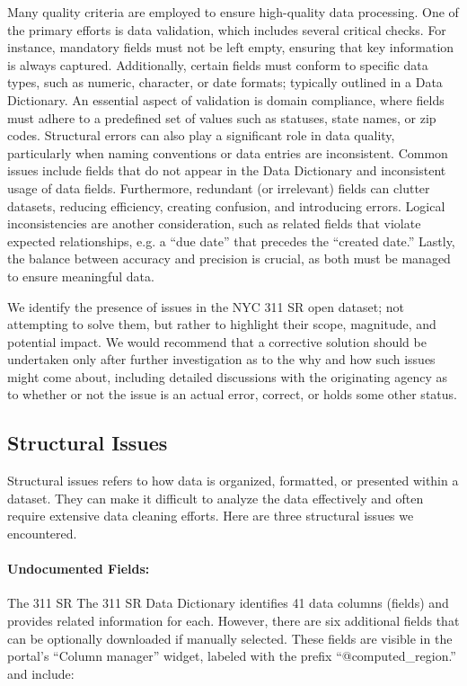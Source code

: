 \documentclass[linenumber]{jdsart}
\begin{document}
Many quality criteria are employed to ensure high-quality data 
processing. One of the primary efforts is data validation, which includes 
several critical checks. For instance, mandatory fields must not be 
left empty, ensuring that key information is always captured. 
Additionally, certain fields must conform to specific data types, 
such as numeric, character, or date formats; typically 
outlined in a Data Dictionary. An essential aspect of 
validation is domain compliance, where 
fields must adhere to a predefined set of 
values such as statuses, state names, or zip codes. Structural 
errors can also play a significant role in data quality, particularly when 
naming conventions or data entries are inconsistent. Common issues 
include fields that do not appear in the Data Dictionary and  
inconsistent usage of data fields. Furthermore, redundant 
(or irrelevant) fields can clutter datasets, reducing efficiency, 
creating confusion, and introducing errors. Logical inconsistencies 
are another consideration, such as related fields that violate expected 
relationships, e.g. a ``due date'' that precedes the ``created date.'' 
Lastly, the balance between accuracy and precision is crucial, as both 
must be managed to ensure meaningful data.


We identify the presence of issues in the NYC 311 SR open dataset;
not attempting to solve them, but rather to highlight their scope, 
magnitude, and potential impact. We would recommend 
that a corrective solution should be undertaken only 
after further investigation as to the why and how such 
issues might come about, including  detailed discussions 
with the originating agency as to whether or not the issue is an 
actual error, correct,  or holds some other status.


\subsection{Structural Issues}
\label{sec:structural}
Structural issues refers to how data is organized, formatted, 
or presented within a dataset. They can make 
it difficult to analyze the data effectively and often require extensive 
data cleaning efforts. Here are three structural issues we encountered.
 
\paragraph{Undocumented Fields:} The 311 SR 
The 311 SR Data Dictionary identifies 
41 data columns (fields) and provides related information 
for each. However, there are six additional fields that can be
optionally downloaded if manually selected. These fields are 
visible in the portal's ``Column manager'' widget, labeled with the prefix 
``@computed\_region.'' and include:
\end{document}

